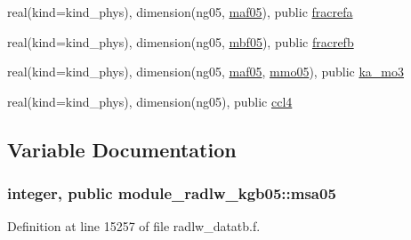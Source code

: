 \begin{DoxyCompactItemize}
\item 
real(kind=kind\+\_\+phys), dimension(ng05, \hyperlink{group__module__radlw__main_gaba904215976d7f4316b52c8f0cffe595}{maf05}), public \hyperlink{group__module__radlw__main_ga335fd60e59154f47724d2e25fdf0a5fb}{fracrefa}
\item 
real(kind=kind\+\_\+phys), dimension(ng05, \hyperlink{group__module__radlw__main_ga57db9a9cb9acac604df555038f6127a3}{mbf05}), public \hyperlink{group__module__radlw__main_gaf7b1fd9c6b966e03a226dd8cbc058670}{fracrefb}
\item 
real(kind=kind\+\_\+phys), dimension(ng05, \hyperlink{group__module__radlw__main_gaba904215976d7f4316b52c8f0cffe595}{maf05}, \hyperlink{group__module__radlw__main_gaa552aae4878030144218ca6c2bbe417f}{mmo05}), public \hyperlink{group__module__radlw__main_ga6021fc2f60379615b7882a28e1caa1e9}{ka\+\_\+mo3}
\item 
real(kind=kind\+\_\+phys), dimension(ng05), public \hyperlink{group__module__radlw__main_ga15c6b3bfa9d8cbf20099dd4f364444b5}{ccl4}
\end{DoxyCompactItemize}


\subsection{Variable Documentation}
\subsubsection[{\texorpdfstring{msa05}{msa05}}]{\setlength{\rightskip}{0pt plus 5cm}integer, public module\+\_\+radlw\+\_\+kgb05\+::msa05}\hypertarget{namespacemodule__radlw__kgb05_a79c5177c6d0e56a69f4d1a0704879539}{}\label{namespacemodule__radlw__kgb05_a79c5177c6d0e56a69f4d1a0704879539}


Definition at line 15257 of file radlw\+\_\+datatb.\+f.

